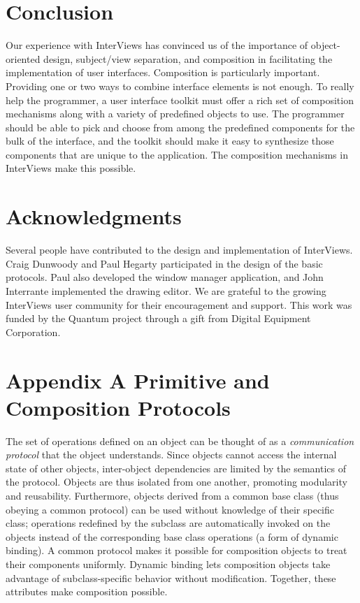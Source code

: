 \section{Conclusion}

Our experience with InterViews has convinced us of the importance of
object-oriented design, subject/view separation, and
composition in facilitating the implementation of user interfaces.
Composition is particularly important.
Providing one or two ways to combine interface elements is not enough.  To
really help the programmer, a user interface toolkit must offer a rich set
of composition mechanisms along with a variety of predefined objects to use.
The programmer should be able to pick and choose from among the predefined
components for the bulk of the interface, and the toolkit should make it
easy to synthesize those components that are unique to the application.  The
composition mechanisms in InterViews make this possible.

\section*{Acknowledgments}

Several people have contributed to the design and implementation of
InterViews.  Craig Dunwoody and Paul Hegarty participated in the
design of the basic protocols. Paul also developed the window
manager application, and John Interrante implemented the drawing
editor.  We are grateful to the growing InterViews user community for
their encouragement and support.  This work was funded by the Quantum
project through a gift from Digital Equipment Corporation.

\clearpage

\section*{Appendix A \newline Primitive and Composition \newline Protocols}

The set of operations defined on an object can be thought of as a {\em
communication protocol\/} that the object understands.  Since objects
cannot access the internal state of other objects, inter-object
dependencies are limited by the semantics of the protocol.  Objects
are thus isolated from one another, promoting modularity and
reusability.  Furthermore, objects derived from a common base class
(thus obeying a common protocol) can be used
without knowledge of their specific class;
operations redefined by the subclass are
automatically invoked on the objects instead of the corresponding base
class operations (a form of dynamic binding).  A common protocol makes
it possible for composition objects to treat their components
uniformly.  Dynamic binding lets composition objects take advantage of
subclass-specific behavior without modification.  Together, these
attributes make composition possible.

